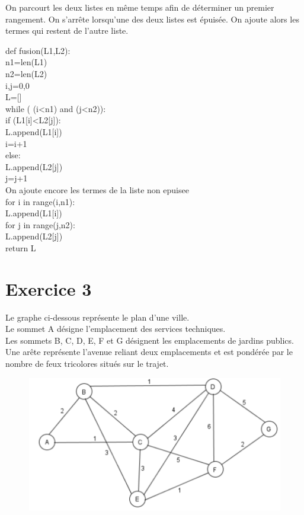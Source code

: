 \documentclass[10pt,a4paper]{article}
\begin{document}
\begin{tcolorbox}
On parcourt les deux listes en même temps afin de déterminer un premier rangement. On s'arrête lorsqu'une des deux listes est épuisée. On ajoute alors les termes qui restent de l'autre liste.

def fusion(L1,L2):\\
    n1=len(L1)\\
    n2=len(L2)\\
    i,j=0,0\\
    L=[]\\
    while ( (i<n1) and (j<n2)):\\
        if (L1[i]<L2[j]):\\
            L.append(L1[i])\\
            i=i+1\\
        else:\\
            L.append(L2[j])\\
            j=j+1\\
    On ajoute encore les termes de la liste non epuisee\\
    for i in range(i,n1):\\
        L.append(L1[i])\\
    for j in range(j,n2):\\
        L.append(L2[j])\\
    return L \\
\end{tcolorbox}

\section*{Exercice 3}
 Le graphe ci-dessous représente le plan d'une ville.\\

Le sommet A désigne l'emplacement des services techniques.\\

Les sommets B, C, D, E, F et G désignent les emplacements de jardins publics. Une arête représente l'avenue reliant deux emplacements et est pondérée par le nombre de feux tricolores situés sur le trajet. \\

\begin{figure}[h!]
    \centering
    \includegraphics[scale=0.6]{Djisktra.png}
    \label{fig:my_label}
\end{figure}
\end{document}
